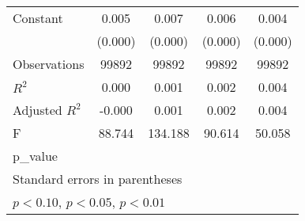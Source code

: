 {\begin{tabular}{l*{4}{c}}
\addlinespace
Constant            &       0.005\sym{***}&       0.007\sym{***}&       0.006\sym{***}&       0.004\sym{***}\\
                    &     (0.000)         &     (0.000)         &     (0.000)         &     (0.000)         \\
\midrule
Observations        &       99892         &       99892         &       99892         &       99892         \\
\(R^{2}\)           &       0.000         &       0.001         &       0.002         &       0.004         \\
Adjusted \(R^{2}\)  &      -0.000         &       0.001         &       0.002         &       0.004         \\
F                   &      88.744         &     134.188         &      90.614         &      50.058         \\
p\_value             &                     &                     &                     &                     \\
\bottomrule
\multicolumn{5}{l}{\footnotesize Standard errors in parentheses}\\
\multicolumn{5}{l}{\footnotesize \sym{*} \(p<0.10\), \sym{**} \(p<0.05\), \sym{***} \(p<0.01\)}\\
\end{tabular}
}
